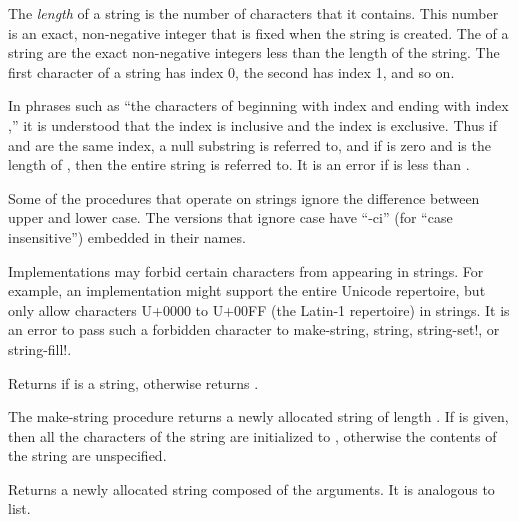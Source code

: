 \vest The {\em length} of a string is the number of characters that it
contains.  This number is an exact, non-negative integer that is fixed when the
string is created.  The  of a string are the
exact non-negative integers less than the length of the string.  The first
character of a string has index 0, the second has index 1, and so on.

\vest In phrases such as ``the characters of  beginning with
index  and ending with index ,'' it is understood
that the index  is inclusive and the index  is
exclusive.  Thus if  and  are the same index, a null
substring is referred to, and if  is zero and  is
the length of , then the entire string is referred to.
It is an error if  is less than .

\vest Some of the procedures that operate on strings ignore the
difference between upper and lower case.  The versions that ignore case
have \hbox{``{\cf -ci}''} (for ``case insensitive'') embedded in their
names.

Implementations may forbid certain characters from appearing in strings.
For example, an implementation might support the entire Unicode repertoire,
but only allow characters U+0000 to U+00FF (the Latin-1 repertoire) in
strings.  It is an error to pass such a forbidden character to
{\cf make-string}, {\cf string}, {\cf string-set!}, or {\cf string-fill!}.


\begin{entry}{%
}

Returns \schtrue{} if  is a string, otherwise returns \schfalse.
\end{entry}


\begin{entry}{%
}

The {\cf make-string} procedure returns a newly allocated string of
length .  If  is given, then all the characters of the string
are initialized to , otherwise the contents of the
string are unspecified.

\end{entry}

\begin{entry}{%
}

Returns a newly allocated string composed of the arguments.
It is analogous to {\cf list}.

\end{entry}

